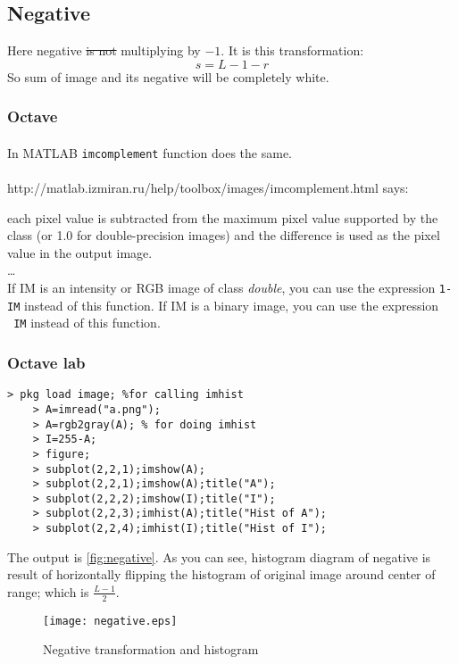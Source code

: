 \subsection{Negative}
Here negative \st{is not} multiplying by $-1$. It is this transformation:
\[s=L-1-r\]
So sum of image and its negative will be completely white.

\subsubsection{Octave}

\paragraph*{}In MATLAB \texttt{imcomplement} function does the same.
\paragraph*{}http://matlab.izmiran.ru/help/toolbox/images/imcomplement.html says:

\begin{displayquote}
    each pixel value is subtracted from the maximum pixel value supported by the
    class (or 1.0 for double-precision images) and the difference is used as the
    pixel value in the output image.\\
    \dots\\
    If IM is an intensity or RGB image of class \emph{double}, you can use the expression \texttt{1-IM} instead of this function. If IM is a binary image, you can use the expression \texttt{~IM} instead of this function.
\end{displayquote}

\subsubsection{Octave lab}
\begin{Verbatim}[frame=single,label=negative,vspace=0pt]
    > pkg load image; %for calling imhist
    > A=imread("a.png");
    > A=rgb2gray(A); % for doing imhist
    > I=255-A;
    > figure;
    > subplot(2,2,1);imshow(A);
    > subplot(2,2,1);imshow(A);title("A");
    > subplot(2,2,2);imshow(I);title("I");
    > subplot(2,2,3);imhist(A);title("Hist of A");
    > subplot(2,2,4);imhist(I);title("Hist of I");
\end{Verbatim}  
The output is \autoref{fig:negative}. As you can see, histogram
diagram of negative is result of horizontally flipping the histogram of original
image around center of range; which is $\frac{L-1}{2}$. 
\begin{figure}[htb!]
\texttt{[image: negative.eps]}
\centering
\caption{Negative transformation and histogram}
\label{fig:negative}
\end{figure}

\pagebreak
        

        
